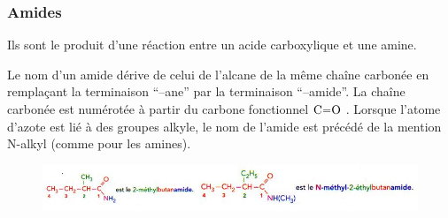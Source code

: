 \documentclass[11pt,a4paper]{article}
\begin{document}
\subsubsection*{Amides}
Ils sont le produit d’une réaction entre un acide carboxylique et une amine.

Le nom d’un amide dérive de celui de l’alcane de la même chaîne carbonée en remplaçant la terminaison  ``–ane'' par la terminaison ``–amide''. La chaîne carbonée est numérotée à partir du carbone fonctionnel $\ce{C=O}$ . Lorsque l’atome d’azote est lié à des groupes alkyle, le nom de l’amide est précédé de la mention N-alkyl (comme pour les amines).   

\begin{figure}[H]
    \centering
    \includegraphics[width=\linewidth]{imgs/c5/exAmide.jpg}
\end{figure}
\end{document}
